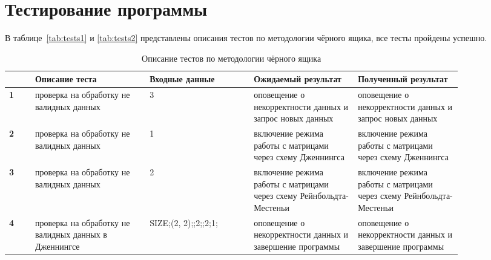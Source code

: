 \section{Тестирование программы}
В таблице~\ref{tab:tests1} и \ref{tab:tests2} представлены описания тестов по методологии чёрного ящика, все тесты пройдены успешно.
\begin{table}[htbp]
	\centering
	\caption{Описание тестов по методологии чёрного ящика}
	\begin{tabular}{|p{0.05\linewidth}|p{0.22\linewidth}|p{0.2\linewidth}|p{0.2\linewidth}|p{0.2\linewidth}|}
		\hline
		& \textbf{Описание теста} & \textbf{Входные данные} & \textbf{Ожидаемый результат} & \textbf{Полученный результат} \\
		\hline
		
		\textbf{1} 
		& проверка на обработку не валидных данных 
		& 3 
		& оповещение о некорректности данных и запрос новых данных 
		& оповещение о некорректности данных и запрос новых данных \\
		\hline
		
		\textbf{2} 
		& проверка на обработку не валидных данных 
		& 1 
		& включение режима работы с матрицами через схему Дженнингса  
		& включение режима работы с матрицами через схему Дженнингса \\
		\hline
		
		\textbf{3} 
		& проверка на обработку не валидных данных 
		& 2
		& включение режима работы с матрицами через схему Рейнбольдта-Местеньи 
		& включение режима работы с матрицами через схему Рейнбольдта-Местеньи \\
		\hline
		
		\textbf{4}
		& проверка на обработку не валидных данных в Дженнингсе 
		& SIZE;(2, 2);\newline 1;2;\newline 2;2;1; 
		& оповещение о некорректности данных и завершение программы 
		& оповещение о некорректности данных  и завершение программы \\
		\hline
		

\end{tabular}
\end{table}
